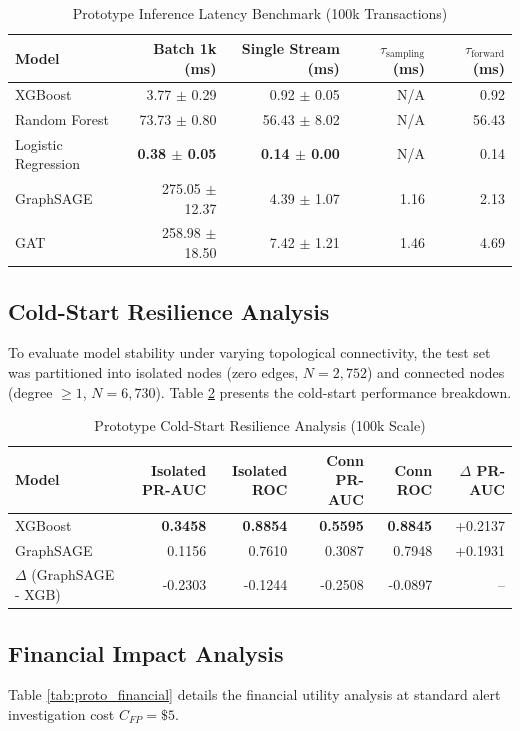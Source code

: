 \documentclass[11pt,a4paper]{report}
\begin{document}
\begin{table}[H]
\centering
\caption{Prototype Inference Latency Benchmark (100k Transactions)}
\label{tab:proto_latency}
\begin{tabular}{lrrrr}
\toprule
\textbf{Model} & \textbf{Batch 1k (ms)} & \textbf{Single Stream (ms)} & $\tau_{\text{sampling}}$ \textbf{(ms)} & $\tau_{\text{forward}}$ \textbf{(ms)} \\
\midrule
XGBoost & 3.77 $\pm$ 0.29 & 0.92 $\pm$ 0.05 & N/A & 0.92 \\
Random Forest & 73.73 $\pm$ 0.80 & 56.43 $\pm$ 8.02 & N/A & 56.43 \\
Logistic Regression & \textbf{0.38 $\pm$ 0.05} & \textbf{0.14 $\pm$ 0.00} & N/A & 0.14 \\
GraphSAGE & 275.05 $\pm$ 12.37 & 4.39 $\pm$ 1.07 & 1.16 & 2.13 \\
GAT & 258.98 $\pm$ 18.50 & 7.42 $\pm$ 1.21 & 1.46 & 4.69 \\
\bottomrule
\end{tabular}
\end{table}

\subsection{Cold-Start Resilience Analysis}
To evaluate model stability under varying topological connectivity, the test set was partitioned into isolated nodes (zero edges, $N = 2,752$) and connected nodes (degree $\geq 1$, $N = 6,730$). Table \ref{tab:proto_coldstart} presents the cold-start performance breakdown.

\begin{table}[H]
\centering
\caption{Prototype Cold-Start Resilience Analysis (100k Scale)}
\label{tab:proto_coldstart}
\begin{tabular}{lrrrrr}
\toprule
\textbf{Model} & \textbf{Isolated PR-AUC} & \textbf{Isolated ROC} & \textbf{Conn PR-AUC} & \textbf{Conn ROC} & $\Delta$ \textbf{PR-AUC} \\
\midrule
XGBoost & \textbf{0.3458} & \textbf{0.8854} & \textbf{0.5595} & \textbf{0.8845} & +0.2137 \\
GraphSAGE & 0.1156 & 0.7610 & 0.3087 & 0.7948 & +0.1931 \\
\midrule
$\Delta$ (GraphSAGE - XGB) & -0.2303 & -0.1244 & -0.2508 & -0.0897 & -- \\
\bottomrule
\end{tabular}
\end{table}

\subsection{Financial Impact Analysis}
Table \ref{tab:proto_financial} details the financial utility analysis at standard alert investigation cost $C_{FP} = \$5$.
\end{document}
